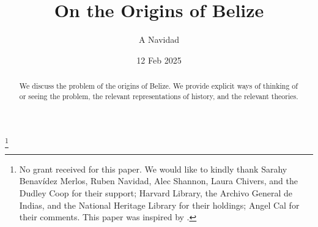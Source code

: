 \documentclass[draft]{amsart} %
\theoremstyle{definition}
\theoremstyle{remark}
\begin{document}
%
%
\title{On the Origins of Belize}
\author{A Navidad}
\address{Harvard College, Cambridge, Mass, USA}
\date{12 Feb 2025}
\thanks{No grant received for this paper. We would like to kindly thank Sarahy Benavídez Merlos, Ruben Navidad, Alec Shannon, Laura Chivers, and the Dudley Coop for their support; Harvard Library, the Archivo General de Indias, and the National Heritage Library for their holdings; Angel Cal for their comments. This paper was inspired by .} %
\begin{abstract}
We discuss the problem of the origins of Belize. We provide explicit ways of thinking of or seeing the problem, the relevant representations of history, and the relevant theories.
\end{abstract}
\maketitle
%
\end{document}
